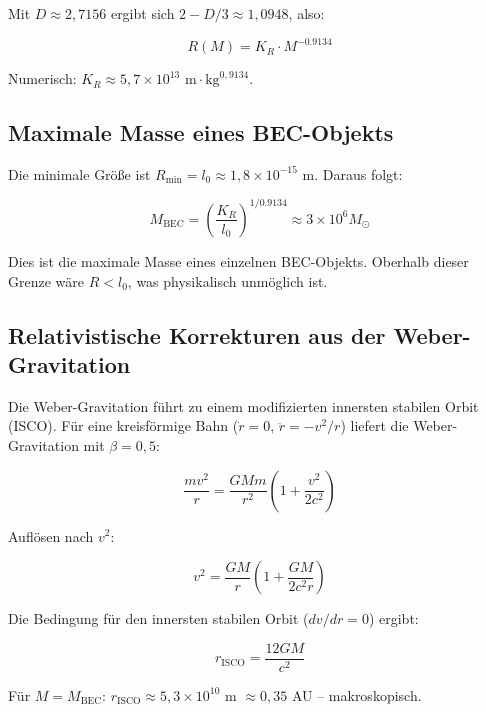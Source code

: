 \documentclass[12pt,a4paper]{article}
\begin{document}
Mit $D \approx 2,7156$ ergibt sich $2 - D/3 \approx 1,0948$, also:

\begin{equation}
R(M) = K_R \cdot M^{-0.9134}
\end{equation}

Numerisch: $K_R \approx 5,7 \times 10^{13} \text{ m} \cdot \text{kg}^{0,9134}$.

\subsection{Maximale Masse eines BEC-Objekts}

Die minimale Größe ist $R_{\min} = l_0 \approx 1,8 \times 10^{-15}$ m. Daraus folgt:

\begin{equation}
M_{\text{BEC}} = \left(\frac{K_R}{l_0}\right)^{1/0.9134} \approx 3 \times 10^6 M_{\odot}
\end{equation}

Dies ist die maximale Masse eines einzelnen BEC-Objekts. Oberhalb dieser Grenze wäre $R < l_0$, was physikalisch unmöglich ist.

\subsection{Relativistische Korrekturen aus der Weber-Gravitation}

Die Weber-Gravitation führt zu einem modifizierten innersten stabilen Orbit (ISCO). Für eine kreisförmige Bahn ($\dot{r} = 0$, $\ddot{r} = -v^2/r$) liefert die Weber-Gravitation mit $\beta = 0,5$:

\begin{equation}
\frac{mv^2}{r} = \frac{GMm}{r^2} \left(1 + \frac{v^2}{2c^2}\right)
\end{equation}

Auflösen nach $v^2$:

\begin{equation}
v^2 = \frac{GM}{r} \left(1 + \frac{GM}{2c^2r}\right)
\end{equation}

Die Bedingung für den innersten stabilen Orbit ($dv/dr = 0$) ergibt:

\begin{equation}
r_{\text{ISCO}} = \frac{12GM}{c^2}
\end{equation}

Für $M = M_{\text{BEC}}$: $r_{\text{ISCO}} \approx 5,3 \times 10^{10}$ m $\approx 0,35$ AU -- makroskopisch.
\end{document}
